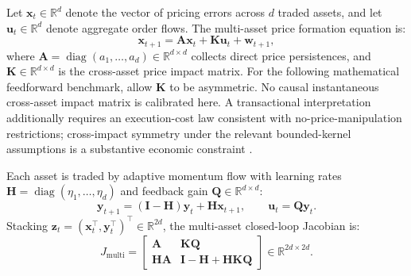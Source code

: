 \documentclass[12pt]{article}
\theoremstyle{definition}
\theoremstyle{remark}
\newcommand{\R}{\mathbb{R}}
\newcommand{\diag}{\operatorname{diag}}
\begin{document}
Let $\mathbf{x}_t \in \R^d$ denote the vector of pricing errors across $d$ traded assets, and let $\mathbf{u}_t \in \R^d$ denote aggregate order flows. The multi-asset price formation equation is:
\begin{equation}
\mathbf{x}_{t+1} = \mathbf{A} \mathbf{x}_t + \mathbf{K} \mathbf{u}_t + \mathbf{w}_{t+1},
\label{eq:multi_price}
\end{equation}
where $\mathbf{A} = \diag(a_1, \dots, a_d) \in \R^{d \times d}$ collects direct price persistences, and $\mathbf{K} \in \R^{d \times d}$ is the cross-asset price impact matrix. For the following mathematical feedforward benchmark, allow $\mathbf K$ to be asymmetric. No causal instantaneous cross-asset impact matrix is calibrated here. A transactional interpretation additionally requires an execution-cost law consistent with no-price-manipulation restrictions; cross-impact symmetry under the relevant bounded-kernel assumptions is a substantive economic constraint \citep{schneiderlillo2017}.

Each asset is traded by adaptive momentum flow with learning rates $\mathbf{H} = \diag(\eta_1, \dots, \eta_d)$ and feedback gain $\mathbf{Q} \in \R^{d \times d}$:
\begin{equation}
\mathbf{y}_{t+1} = (\mathbf{I} - \mathbf{H}) \mathbf{y}_t + \mathbf{H} \mathbf{x}_{t+1}, \qquad \mathbf{u}_t = \mathbf{Q} \mathbf{y}_t.
\end{equation}
Stacking $\mathbf{z}_t = (\mathbf{x}_t^\top, \mathbf{y}_t^\top)^\top \in \R^{2d}$, the multi-asset closed-loop Jacobian is:
\begin{equation}
J_{\text{multi}} = \begin{bmatrix}
\mathbf{A} & \mathbf{K} \mathbf{Q} \\
\mathbf{H} \mathbf{A} & \mathbf{I} - \mathbf{H} + \mathbf{H} \mathbf{K} \mathbf{Q}
\end{bmatrix} \in \R^{2d \times 2d}.
\label{eq:multi_jacobian}
\end{equation}
\end{document}
